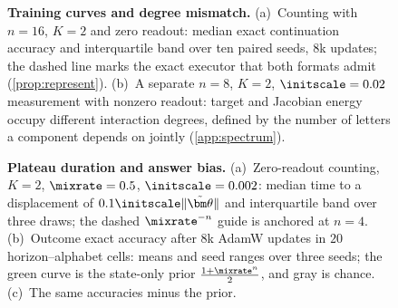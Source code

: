 
\begin{figure}[H]
\centering

\caption{\textbf{Training curves and degree mismatch.}
(a)~Counting with $n=16$, $K=2$ and zero readout: median exact continuation accuracy and interquartile band over ten paired seeds, $8$k
updates; the dashed line marks the exact executor that both formats admit (\cref{prop:represent}).
(b)~A separate $n=8$, $K=2$, $\initscale=0.02$ measurement with nonzero readout: target and Jacobian energy occupy different interaction degrees, defined by the number of letters a component depends on jointly (\cref{app:spectrum}).}
\label{fig:overview}
\end{figure}

\begin{figure}[H]
\centering
\resizebox{\linewidth}{!}{}
\caption{\textbf{Plateau duration and answer bias.}
(a)~Zero-readout counting, $K=2$, $\mixrate=0.5$, $\initscale=0.002$: median time to a displacement of $0.1\initscale\|\tilde{\bm\theta}\|$ and interquartile band over three draws; the dashed $\mixrate^{-n}$ guide is anchored at $n=4$.
(b)~Outcome exact accuracy after $8$k AdamW updates in $20$ horizon--alphabet cells: means and seed ranges over three seeds; the green curve is the state-only prior $\frac{1+\mixrate^n}{2}$, and gray is chance.
(c)~The same accuracies minus the prior.}
\label{fig:theory-measurement}
\label{fig:lambda-grid}
\end{figure}
